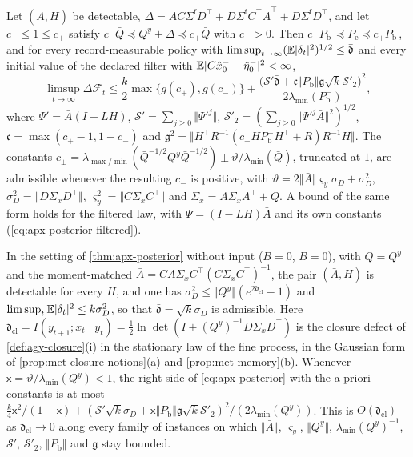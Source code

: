 \begin{theorem}\label{thm:apx-posterior}
Let $(\bar A,H)$ be detectable, $\Delta=\bar AC\Sigma^{\mathrm f}D^\top+D\Sigma^{\mathrm f}C^\top\bar A^\top+D\Sigma^{\mathrm f}D^\top$, and let $c_-\le1\le c_+$ satisfy $c_-\bar Q\preceq Q^y+\Delta\preceq c_+\bar Q$ with $c_->0$. Then $c_-P^-_{\mathrm b}\preceq P_{\mathrm e}\preceq c_+P^-_{\mathrm b}$, and for every record-measurable policy with $\limsup_{t\to\infty}(\mathbb{E}\lvert\delta_t\rvert^2)^{1/2}\le\bar{\mathfrak d}$ and every initial value of the declared filter with $\mathbb{E}\lvert C\hat x^-_0-\hat\eta^-_0\rvert^2<\infty$,
\begin{equation}\label{eq:apx-posterior}
\limsup_{t\to\infty}\Delta\mathcal F_t\le\frac k2\max\{g(c_+),g(c_-)\}+\frac{\bigl(\mathcal S'\bar{\mathfrak d}+\mathfrak c\Vert P_{\mathrm b}\Vert\mathfrak g\sqrt k\mathcal S'_2\bigr)^2}{2\lambda_{\min}(P^-_{\mathrm b})},
\end{equation}
where $\Psi'=\bar A(I-LH)$, $\mathcal S'=\sum_{j\ge0}\Vert\Psi'^j\Vert$, $\mathcal S'_2=(\sum_{j\ge0}\Vert\Psi'^j\bar A\Vert^2)^{1/2}$, $\mathfrak c=\max(c_+-1,1-c_-)$ and $\mathfrak g^2=\Vert H^\top R^{-1}(c_+HP^-_{\mathrm b}H^\top+R)R^{-1}H\Vert$. The constants $c_\pm=\lambda_{\max/\min}(\bar Q^{-1/2}Q^y\bar Q^{-1/2})\pm\vartheta/\lambda_{\min}(\bar Q)$, truncated at $1$, are admissible whenever the resulting $c_-$ is positive, with $\vartheta=2\Vert\bar A\Vert\varsigma_y\sigma_D+\sigma_D^2$, $\sigma_D^2=\Vert D\Sigma_xD^\top\Vert$, $\varsigma_y^2=\Vert C\Sigma_xC^\top\Vert$ and $\Sigma_x=A\Sigma_xA^\top+Q$. A bound of the same form holds for the filtered law, with $\Psi=(I-LH)\bar A$ and its own constants (\cref{eq:apx-posterior-filtered}).
\end{theorem}

\begin{corollary}\label{cor:apx-memory}
In the setting of \cref{thm:apx-posterior} without input ($B=0$, $\bar B=0$), with $\bar Q=Q^y$ and the moment-matched $\bar A=CA\Sigma_xC^\top(C\Sigma_xC^\top)^{-1}$, the pair $(\bar A,H)$ is detectable for every $H$, and one has $\sigma_D^2\le\Vert Q^y\Vert(e^{2\mathfrak d_{\mathrm{cl}}}-1)$ and $\limsup_t\mathbb{E}\lvert\delta_t\rvert^2\le k\sigma_D^2$, so that $\bar{\mathfrak d}=\sqrt k\sigma_D$ is admissible. Here $\mathfrak d_{\mathrm{cl}}=I(y_{t+1};x_t\mid y_t)=\frac12\ln\det(I+(Q^y)^{-1}D\Sigma_xD^\top)$ is the closure defect of \cref{def:agy-closure}(i) in the stationary law of the fine process, in the Gaussian form of \cref{prop:met-closure-notions}(a) and \cref{prop:met-memory}(b). Whenever $\mathsf x=\vartheta/\lambda_{\min}(Q^y)<1$, the right side of \cref{eq:apx-posterior} with the a priori constants is at most $\frac k4\mathsf x^2/(1-\mathsf x)+(\mathcal S'\sqrt k\sigma_D+\mathsf x\Vert P_{\mathrm b}\Vert\mathfrak g\sqrt k\mathcal S'_2)^2/(2\lambda_{\min}(Q^y))$. This is $O(\mathfrak d_{\mathrm{cl}})$ as $\mathfrak d_{\mathrm{cl}}\to0$ along every family of instances on which $\Vert\bar A\Vert$, $\varsigma_y$, $\Vert Q^y\Vert$, $\lambda_{\min}(Q^y)^{-1}$, $\mathcal S'$, $\mathcal S'_2$, $\Vert P_{\mathrm b}\Vert$ and $\mathfrak g$ stay bounded.
\end{corollary}

